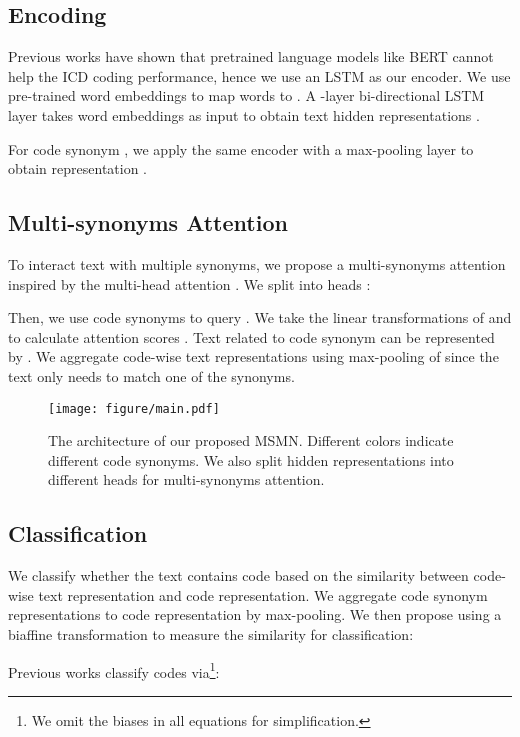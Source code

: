 \documentclass[11pt]{article}
\begin{document}
\subsection{Encoding}
Previous works \cite{JI2021104998,pascual-etal-2021-towards} have shown that pretrained language models like BERT \cite{devlin-etal-2019-bert} cannot help the ICD coding performance, hence we use an LSTM \cite{hochreiter1997long} as our encoder.
We use pre-trained word embeddings to map words   to .
A -layer bi-directional LSTM layer takes word embeddings as input to obtain text hidden representations .

For code synonym , we apply the same encoder with a max-pooling layer to obtain representation .


\subsection{Multi-synonyms Attention}
To interact text with multiple synonyms, we propose a multi-synonyms attention inspired by the multi-head attention  \cite{vaswani2017attention}.
We split  into  heads :

Then, we use code synonyms  to query . We take the linear transformations 
of  and  to calculate attention scores .
Text related to code synonym  can be represented by .
We aggregate code-wise text representations  using max-pooling of  since the text only needs to match one of the synonyms.





\begin{figure}
\centering
\texttt{[image: figure/main.pdf]}
\caption{The architecture of our proposed MSMN. 
Different colors indicate different code synonyms. We also split hidden representations into different heads for multi-synonyms attention.
}
\label{arch}
\end{figure}

\subsection{Classification}
We classify whether the text  contains code  based on the similarity between code-wise text representation  and code representation.
We aggregate code synonym representations  to code representation  by max-pooling.
We then propose using a biaffine transformation to measure the similarity for classification:

Previous works \cite{mullenbach-etal-2018-explainable,ijcai2020-461-vu}  classify codes via\footnote{We omit the biases in all equations for simplification.}:
\end{document}
